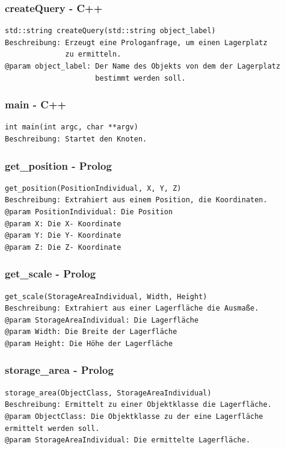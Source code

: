 \documentclass{suturo}
\begin{document}
\subsubsection{createQuery - C++}
\begin{verbatim}
std::string createQuery(std::string object_label)
Beschreibung: Erzeugt eine Prologanfrage, um einen Lagerplatz 
              zu ermitteln.
@param object_label: Der Name des Objekts von dem der Lagerplatz 
                     bestimmt werden soll.
\end{verbatim}\label{func:segmentplanes}

\subsubsection{main - C++}
\begin{verbatim}
int main(int argc, char **argv)
Beschreibung: Startet den Knoten.
\end{verbatim}\label{func:findcentergazebo}


\subsubsection{get\_position - Prolog}
\begin{verbatim}
get_position(PositionIndividual, X, Y, Z)
Beschreibung: Extrahiert aus einem Position, die Koordinaten.
@param PositionIndividual: Die Position
@param X: Die X- Koordinate
@param Y: Die Y- Koordinate
@param Z: Die Z- Koordinate
\end{verbatim}\label{func:findposes}

\subsubsection{get\_scale - Prolog}
\begin{verbatim}
get_scale(StorageAreaIndividual, Width, Height)
Beschreibung: Extrahiert aus einer Lagerfläche die Ausmaße.
@param StorageAreaIndividual: Die Lagerfläche
@param Width: Die Breite der Lagerfläche
@param Height: Die Höhe der Lagerfläche
\end{verbatim}\label{func:estimatesurfacenormals}

\subsubsection{storage\_area - Prolog}
\begin{verbatim}
storage_area(ObjectClass, StorageAreaIndividual)
Beschreibung: Ermittelt zu einer Objektklasse die Lagerfläche.
@param ObjectClass: Die Objektklasse zu der eine Lagerfläche
ermittelt werden soll.
@param StorageAreaIndividual: Die ermittelte Lagerfläche.
\end{verbatim}\label{func:apply3dfilter}
\end{document}
